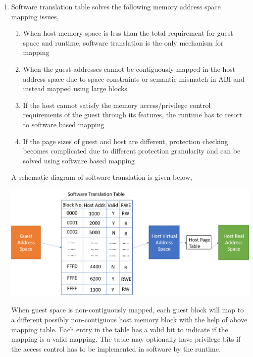 \documentclass[11pt,a4paper,oneside]{article}
\begin{document}
\begin{enumerate}
		\item Software translation table solves the following memory address space mapping issues,
			\begin{enumerate}
				\item When host memory space is less than the total requirement for guest space and runtime, software translation is the only mechanism for mapping
				\item When the guest addresses cannot be contiguously mapped in the host address space due to space constraints or semantic mismatch in ABI and instead mapped using large blocks
				\item If the host cannot satisfy the memory access/privilege control requirements of the guest through its features, the runtime has to resort to software based mapping
				\item If the page sizes of guest and host are different, protection checking becomes complicated due to different protection granularity and can be solved using software based mapping
			\end{enumerate}
		    A schematic diagram of software translation is given below,
		    \begin{center}
		    	\includegraphics[scale=0.4]{2.png}
		    \end{center}
	        When guest space is non-contiguously mapped, each guest block will map to a different possibly non-contiguous host memory block with the help of above mapping table. Each entry in the table has a valid bit to indicate if the mapping is a valid mapping. The table may optionally have privilege bits if the access control has to be implemented in software by the runtime.
		    
		    
		

\end{enumerate}
\end{document}
